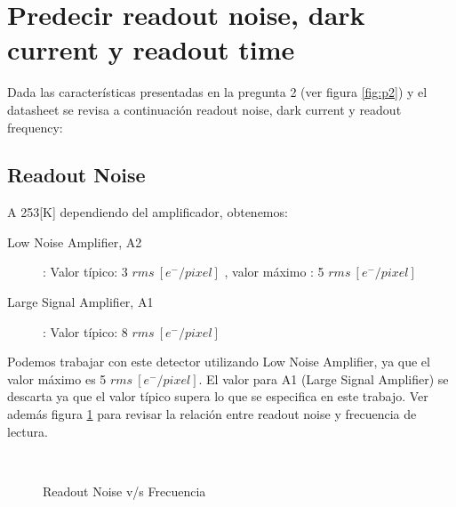 \documentclass[a4paper,10pt]{article}
\begin{document}
\section{Predecir readout noise, dark current y readout time}
Dada las características presentadas en la pregunta 2 (ver figura \ref{fig:p2})
y el datasheet se revisa a continuación readout noise, dark current y readout
frequency:
\subsection{Readout Noise}
A 253[K] dependiendo del amplificador, obtenemos:
\begin{description}
\item [Low Noise Amplifier, A2]: Valor típico: 3 $rms\ [e^-/pixel]$ , valor máximo : 5 $rms\ [e^-/pixel]$
\item [Large Signal Amplifier, A1]: Valor típico: 8 $rms\ [e^-/pixel]$
\end{description}
Podemos trabajar con este detector utilizando Low Noise Amplifier, ya que el
valor máximo es 5 $rms\ [e^-/pixel]$. El valor para A1 (Large Signal Amplifier)
se descarta ya que el valor típico supera lo que se especifica en este trabajo.
Ver además figura \ref{fig:p3_1} para revisar la relación entre readout noise y
frecuencia de lectura.
\begin{figure}[ht!]
  \centering
  ~ 
  \caption{Readout Noise v/s Frecuencia}
  \label{fig:p3_1}
\end{figure}
\end{document}
